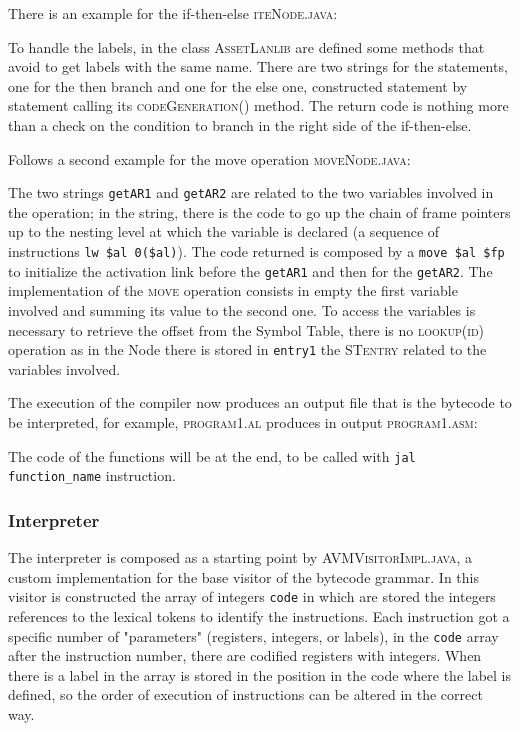 \documentclass[11pt]{article} %
\begin{document}
\medskip

There is an example for the if-then-else \textsc{iteNode.java}:

To handle the labels, in the class \textsc{AssetLanlib} are defined some methods that avoid to get labels with the same name. There are two strings for the statements, one for the then branch and one for the else one, constructed statement by statement calling its \textsc{codeGeneration()} method. The return code is nothing more than a check on the condition to branch in the right side of the if-then-else.  

\medskip

Follows a second example for the move operation \textsc{moveNode.java}:

The two strings \verb|getAR1| and \verb|getAR2| are related to the two variables involved in the operation; in the string, there is the code to go up the chain of frame pointers up to the nesting level at which the variable is declared (a sequence of instructions \verb|lw $al 0($al)|). The code returned is composed by a \verb|move $al $fp| to initialize the activation link before the \verb|getAR1| and then for the \verb|getAR2|. The implementation of the \textsc{move} operation consists in empty the first variable involved and summing its value to the second one. To access the variables is necessary to retrieve the offset from the Symbol Table, there is no \textsc{lookup(id)} operation as in the Node there is stored in \verb|entry1| the \textsc{STentry} related to the variables involved.

\medskip

The execution of the compiler now produces an output file that is the bytecode to be interpreted, for example, \textsc{program1.al} produces in output \textsc{program1.asm}:

The code of the functions will be at the end, to be called with \verb|jal function_name| instruction.

\subsubsection{Interpreter}
The interpreter is composed as a starting point by \textsc{AVMVisitorImpl.java}, a custom implementation for the base visitor of the bytecode grammar. In this visitor is constructed the array of integers \verb|code| in which are stored the integers references to the lexical tokens to identify the instructions. Each instruction got a specific number of "parameters" (registers, integers, or labels), in the \verb|code| array after the instruction number, there are codified registers with integers. When there is a label in the array is stored in the position in the code where the label is defined, so the order of execution of instructions can be altered in the correct way.
\end{document}
